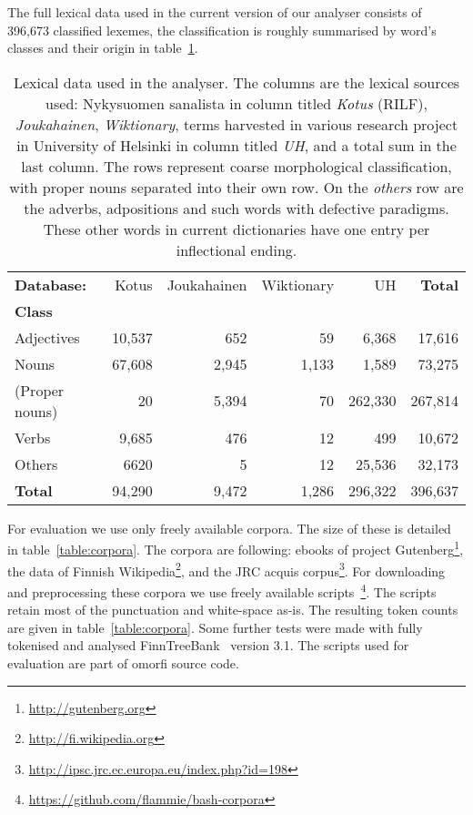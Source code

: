 \documentclass[a4paper,12pt]{article}
\begin{document}
The full lexical data used in the current version of our analyser consists of
396,673 classified lexemes, the classification is roughly summarised by word's
classes and their origin in table~\ref{table:lexical}. 

\begin{table}
    \begin{scriptsize}
  \centering
    \begin{tabular}{|l|r|r|r|r||r|}
        \hline
        \bf Database: & Kotus & Joukahainen & Wiktionary & UH & \bf Total \\
        \bf Class   & & & & & \\
        \hline
        Adjectives     & 10,537 & 652   & 59    & 6,368   & 17,616  \\
        Nouns          & 67,608 & 2,945 & 1,133 & 1,589   & 73,275  \\
        (Proper nouns) & 20     & 5,394 & 70    & 262,330 & 267,814 \\
        Verbs          & 9,685  & 476   & 12    & 499     & 10,672  \\
        Others         & 6620   & 5     & 12    & 25,536  & 32,173  \\
        \hline
        \bf Total      & 94,290 & 9,472 & 1,286 & 296,322 & 396,637 \\
        \hline
    \end{tabular}
  \caption{Lexical data used in the analyser.  The columns are the lexical
      sources used: Nykysuomen sanalista in column titled \emph{Kotus} (RILF),
      \emph{Joukahainen}, \emph{Wiktionary}, terms harvested in various
      research project in University of Helsinki in column titled \emph{UH},
      and a total sum in the last column. The rows represent coarse
      morphological classification, with proper nouns separated into their own
      row. On the \emph{others} row are the adverbs, adpositions and such words
      with defective paradigms. These other words in current dictionaries have one
      entry per inflectional ending.
  \label{table:lexical}}
  \end{scriptsize}
\end{table}


For evaluation we use only freely available corpora. The size of these is
detailed in table~\ref{table:corpora}. The corpora are following: ebooks of project
Gutenberg\footnote{\url{http://gutenberg.org}}, the data of Finnish
Wikipedia\footnote{\url{http://fi.wikipedia.org}}, and the JRC acquis
corpus\footnote{\url{http://ipsc.jrc.ec.europa.eu/index.php?id=198}}. For
downloading and preprocessing these corpora we use freely available
scripts~\footnote{\url{https://github.com/flammie/bash-corpora}}. The scripts
retain most of the punctuation and white-space as-is. The resulting
token counts are given in table~\ref{table:corpora}. Some further tests were made
with fully tokenised and analysed
FinnTreeBank~\citep{voutilainen2012specifying} version 3.1.  The scripts used
for evaluation are part of omorfi source code.
\end{document}
